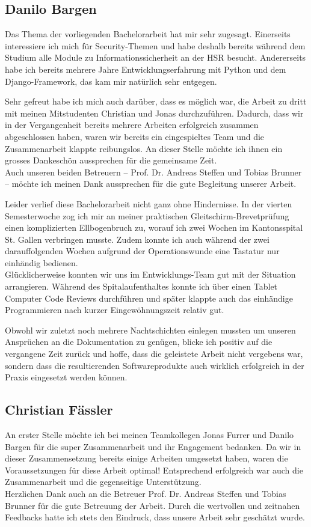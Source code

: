 \subsection{Danilo Bargen}

Das Thema der vorliegenden Bachelorarbeit hat mir sehr zugesagt. Einerseits
interessiere ich mich für Security-Themen und habe deshalb bereits während dem
Studium alle Module zu Informationssicherheit an der HSR besucht. Andererseits
habe ich bereits mehrere Jahre Entwicklungserfahrung mit Python und dem
Django-Framework, das kam mir natürlich sehr entgegen.

Sehr gefreut habe ich mich auch darüber, dass es möglich war, die Arbeit zu
dritt mit meinen Mitstudenten Christian und Jonas durchzuführen. Dadurch, dass
wir in der Vergangenheit bereits mehrere Arbeiten erfolgreich zusammen
abgeschlossen haben, waren wir bereits ein eingespieltes Team und die
Zusammenarbeit klappte reibungslos. An dieser Stelle möchte ich ihnen ein
grosses Dankeschön aussprechen für die gemeinsame Zeit. \\
Auch unseren beiden Betreuern -- Prof. Dr. Andreas Steffen und Tobias Brunner --
möchte ich meinen Dank aussprechen für die gute Begleitung unserer Arbeit.

Leider verlief diese Bachelorarbeit nicht ganz ohne Hindernisse. In der vierten
Semesterwoche zog ich mir an meiner praktischen Gleitschirm-Brevetprüfung einen
komplizierten Ellbogenbruch zu, worauf ich zwei Wochen im Kantonsspital St.
Gallen verbringen musste. Zudem konnte ich auch während der zwei darauffolgenden
Wochen aufgrund der Operationswunde eine Tastatur nur einhändig bedienen.\\
Glücklicherweise konnten wir uns im Entwicklungs-Team gut mit der Situation
arrangieren. Während des Spitalaufenthaltes konnte ich über einen Tablet
Computer Code Reviews durchführen und später klappte auch das einhändige
Programmieren nach kurzer Eingewöhnungszeit relativ gut.

Obwohl wir zuletzt noch mehrere Nachtschichten einlegen mussten um unseren
Ansprüchen an die Dokumentation zu genügen, blicke ich positiv auf die
vergangene Zeit zurück und hoffe, dass die geleistete Arbeit nicht vergebens
war, sondern dass die resultierenden Softwareprodukte auch wirklich erfolgreich
in der Praxis eingesetzt werden können.



\subsection{Christian Fässler} 
An erster Stelle möchte ich bei meinen Teamkollegen Jonas Furrer und Danilo
Bargen für die super Zusammenarbeit und ihr Engagement bedanken. Da wir in
dieser Zusammensetzung bereits einige Arbeiten umgesetzt haben, waren die
Voraussetzungen für diese Arbeit optimal! Entsprechend erfolgreich war auch die
Zusammenarbeit und die gegenseitige Unterstützung.\\ Herzlichen Dank auch an die
Betreuer Prof. Dr. Andreas Steffen und Tobias Brunner für die gute Betreuung der
Arbeit. Durch die wertvollen und zeitnahen Feedbacks hatte ich stets den
Eindruck, dass unsere Arbeit sehr geschätzt wurde.


